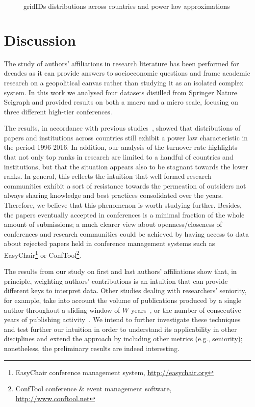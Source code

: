 \documentclass{llncs}
\begin{document}
\begin{figure}[h]
\begin{subfigure}{.5\textwidth}
	\caption[ ]{}
	\label{fig:tpdl_gridids_longtail}
\end{subfigure}
\caption{gridIDs distributions across countries and power law approximations}
\label{fig:gridids_longtail}
\end{figure}


\section{Discussion}
\label{sec:discussion}
The study of authors' affiliations in research literature has been performed for decades as it can provide answers to socioeconomic questions and frame academic research on a geopolitical canvas rather than studying it as an isolated complex system.
In this work we analysed four datasets distilled from Springer Nature Scigraph and provided results on both a macro and a micro scale, focusing on three different high-tier conferences.

The results, in accordance with previous studies~\cite{may1997,king2004a,pan2012}, showed that distributions of papers and institutions across countries still exhibit a power law characteristic in the period 1996-2016.
In addition, our analysis of the turnover rate highlights that not only top ranks in research are limited to a handful of countries and institutions, but that the situation appears also to be stagnant towards the lower ranks.
In general, this reflects the intuition that well-formed research communities exhibit a sort of resistance towards the permeation of outsiders not always sharing knowledge and best practices consolidated over the years.
Therefore, we believe that this phenomenon is worth studying further.
Besides, the papers eventually accepted in conferences is a minimal fraction of the whole amount of submissions; a much clearer view about openness/closeness of conferences and research communities could be achieved by having access to data about rejected papers held in conference management systems such as EasyChair\footnote{EasyChair conference management system, \url{http://easychair.org}} or ConfTool\footnote{ConfTool conference \& event management software, \url{http://www.conftool.net}}.

The results from our study on first and last authors' affiliations show that, in principle, weighting authors' contributions is an intuition that can provide different keys to interpret data. 
Other studies dealing with researchers' seniority, for example, take into account the volume of publications produced by a single author throughout a sliding window of $W$ years~\cite{Verleysen2016}, or the number of consecutive years of publishing activity~\cite{Jadidi2017}.
We intend to further investigate these techniques and test further our intuition in order to understand its applicability in other disciplines and extend the approach by including other metrics (e.g., seniority); nonetheless, the preliminary results are indeed interesting.
\end{document}
